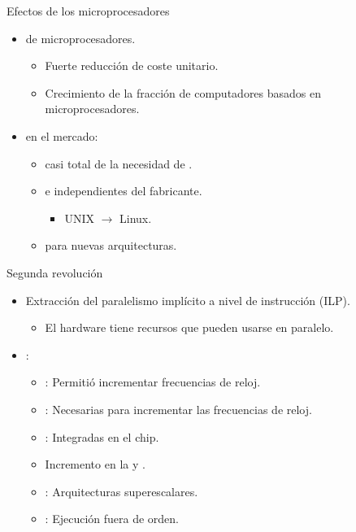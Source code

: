 \begin{frame}[t]{Efectos de los microprocesadores}
\begin{itemize}
  \item {} de microprocesadores.
    \begin{itemize}
      \item Fuerte reducción de coste unitario.
      \item Crecimiento de la fracción de computadores basados en microprocesadores.
    \end{itemize}

  \item {} en el mercado:
    \begin{itemize}
      \item {} casi total de la necesidad de 
            .
      \item {}  e independientes 
            del fabricante.
        \begin{itemize}
          \item UNIX $\rightarrow$ Linux.
        \end{itemize}
      \item {} para nuevas arquitecturas.
    \end{itemize}
\end{itemize}
\end{frame}

\begin{frame}[t]{Segunda revolución}
\begin{itemize}
  \item Extracción del paralelismo implícito a nivel de instrucción (ILP).
    \begin{itemize}
      \item El hardware tiene recursos que pueden usarse en paralelo.
    \end{itemize}
  \pause
  \item {}:
    \begin{itemize}[<+->]
      \item {}: Permitió incrementar frecuencias de reloj.
      \item {}: Necesarias para incrementar las frecuencias de reloj.
      \item {}: Integradas en el chip.
      \item Incremento en la  y .
      \item {}: Arquitecturas superescalares.
      \item {}: Ejecución fuera de orden.
    \end{itemize}
\end{itemize}
\end{frame}

